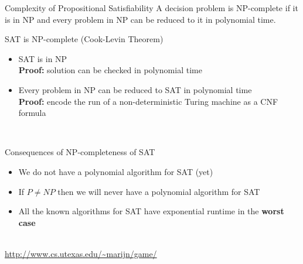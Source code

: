 \documentclass[t]{sdqbeamer}
\begin{document}
\begin{frame}{Complexity of Propositional Satisfiability}
\vspace*{-1em}
A decision problem is NP-complete if it is in NP and every problem in NP can be reduced to it in polynomial time.
\begin{block}{SAT is NP-complete (Cook-Levin Theorem)}
\begin{itemize}\itemsep1ex
	\item SAT is in NP\\
	\textbf{Proof:} solution can be checked in polynomial time
	\item Every problem in NP can be reduced to SAT in polynomial time\\
	\textbf{Proof:} encode the run of a non-deterministic Turing machine as a CNF formula
\end{itemize}
\end{block}~\\
\pause
\begin{block}{Consequences of NP-completeness of SAT}
\begin{itemize}\itemsep1ex
	\item We do not have a polynomial algorithm for SAT (yet) ~
	\item If $P \neq NP$ then we will never have a polynomial algorithm for SAT ~
	\item All the known algorithms for SAT have exponential runtime in the \textbf{worst case} ~
\end{itemize}
\end{block}~\\
\pause
{} \url{http://www.cs.utexas.edu/~marijn/game/}
\end{frame}
\end{document}
